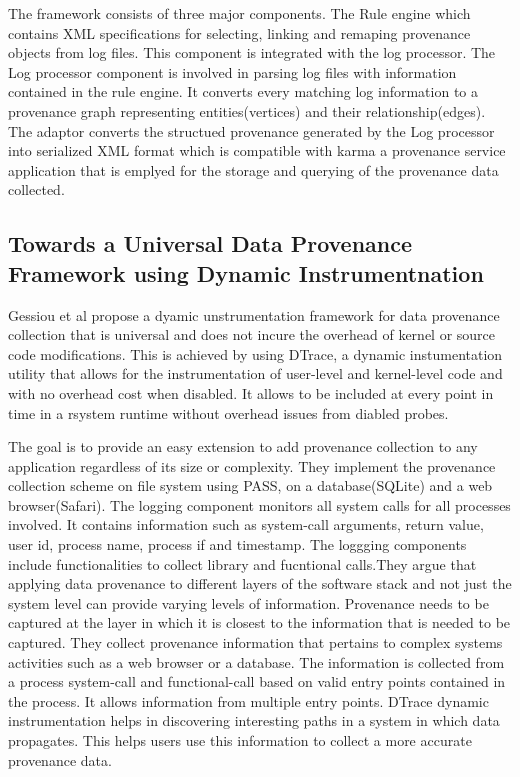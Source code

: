 The framework consists of three major components. The Rule engine which contains XML specifications for selecting, linking and remaping provenance objects from log files. This component is integrated with the log processor. The Log processor component is involved in parsing log files with information contained in the rule engine. It converts every matching log information to a provenance graph representing entities(vertices) and their relationship(edges). The adaptor converts the structued provenance generated by the Log processor into serialized XML format which is compatible with karma a provenance service application that is emplyed for the storage and querying of the provenance data collected.




\subsection{Towards a Universal Data Provenance Framework using Dynamic Instrumentnation}

Gessiou et al propose a dyamic unstrumentation framework for data provenance collection that is universal and does not incure the overhead of kernel or source code modifications. This is achieved by using DTrace, a dynamic instumentation utility that allows for the instrumentation of user-level and kernel-level code and with no overhead cost when disabled. It allows to be included at every point in time in a rsystem  runtime without overhead issues from diabled probes.

The goal is to provide an easy extension to add provenance collection to any application regardless of its size or complexity. They implement the provenance collection scheme on file system using PASS, on a database(SQLite) and a web browser(Safari). 
The logging component monitors all system calls for all processes involved. It contains information such as system-call arguments, return value, user id, process name, process if and timestamp. The loggging components include functionalities to collect library and fucntional calls.They argue that applying data provenance to different layers of the software stack and not just the system level can provide varying levels of information.  Provenance needs to be captured at the layer in which it is closest to the information that is needed to be captured. They collect provenance information that pertains to complex systems activities such as a web browser or a database. The information is collected from a process system-call and functional-call based on valid entry points contained in the process. It allows information from multiple entry points. DTrace dynamic instrumentation helps in discovering interesting paths in a system in which data propagates. This helps users use this information to collect a more accurate provenance data.




